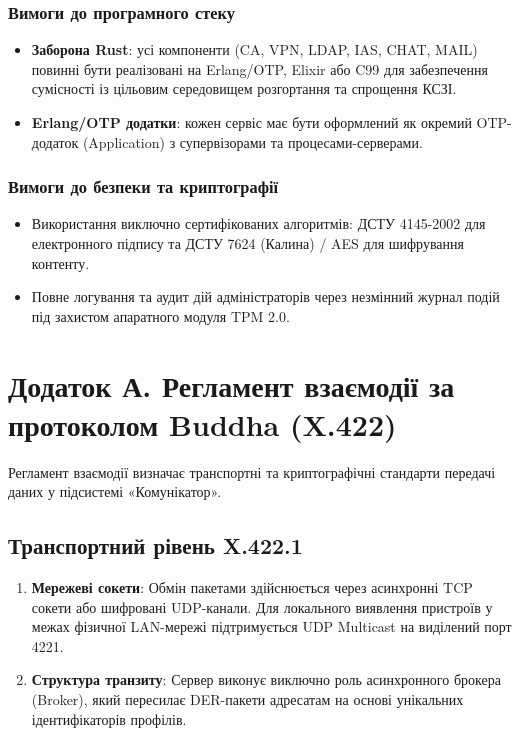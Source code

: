 \documentclass{article}
\begin{document}
\subsubsection{Вимоги до програмного стеку}
\begin{itemize}
    \item \textbf{Заборона Rust}: усі компоненти (CA, VPN, LDAP, IAS, CHAT, MAIL) повинні бути реалізовані на Erlang/OTP, Elixir або C99 для забезпечення сумісності із цільовим середовищем розгортання та спрощення КСЗІ.
    \item \textbf{Erlang/OTP додатки}: кожен сервіс має бути оформлений як окремий OTP-додаток (Application) з супервізорами та процесами-серверами.
\end{itemize}

\subsubsection{Вимоги до безпеки та криптографії}
\begin{itemize}
    \item Використання виключно сертифікованих алгоритмів: ДСТУ 4145-2002 для електронного підпису та ДСТУ 7624 (Калина) / AES для шифрування контенту.
    \item Повне логування та аудит дій адміністраторів через незмінний журнал подій під захистом апаратного модуля TPM 2.0.
\end{itemize}

\newpage
\section{Додаток А. Регламент взаємодії за протоколом Buddha (X.422)}

Регламент взаємодії визначає транспортні та криптографічні стандарти передачі даних у підсистемі «Комунікатор».

\subsection{Транспортний рівень X.422.1}
\begin{enumerate}
    \item \textbf{Мережеві сокети}: Обмін пакетами здійснюється через асинхронні TCP сокети або шифровані UDP-канали. Для локального виявлення пристроїв у межах фізичної LAN-мережі підтримується UDP Multicast на виділений порт 4221.
    \item \textbf{Структура транзиту}: Сервер виконує виключно роль асинхронного брокера (Broker), який пересилає DER-пакети адресатам на основі унікальних ідентифікаторів профілів.
\end{enumerate}
\end{document}
